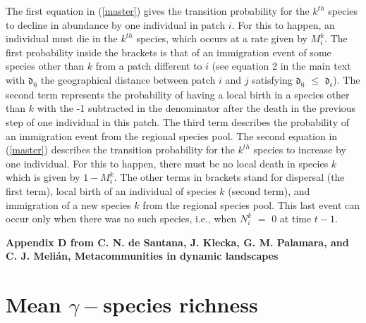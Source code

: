 \documentclass[12pt]{article}
\begin{document}
The first equation in (\ref{master}) gives the transition probability
for the $k^{th}$ species to decline in abundance by one individual in
patch $i$. For this to happen, an individual must die in the $k^{th}$
species, which occurs at a rate given by $M^{k}_{i}$. The first
probability inside the brackets is that of an immigration event of
some species other than $k$ from a patch different to $i$ (see
equation 2 in the main text with $\mathfrak{d_{ij}}$ the geographical
distance between patch $i$ and $j$ satisfying $\mathfrak{d_{ij}}$
$\leq$ $\mathfrak{d_{c}}$). The second term represents the probability
of having a local birth in a species other than $k$ with the -1
subtracted in the denominator after the death in the previous step of
one individual in this patch. The third term describes the probability
of an immigration event from the regional species pool. The second
equation in (\ref{master}) describes the transition probability for
the $k^{th}$ species to increase by one individual. For this to
happen, there must be no local death in species $k$ which is given by
$1 - M^{k}_{i}$. The other terms in brackets stand for dispersal (the
first term), local birth of an individual of species $k$ (second
term), and immigration of a new species $k$ from the regional species
pool. This last event can occur only when there was no such species,
i.e., when $N_{i}^{k}$ $=$ 0 at time $t - 1$.  

\clearpage
\begin{flushleft} 
{\Large \textbf{Appendix D from C. N. de Santana, J. Klecka, G. M. Palamara, and C. J. Meli\'{a}n, Metacommunities in dynamic landscapes}}
\section*{Mean $\gamma-$species richness}
\end{flushleft}
\renewcommand{\theequation}{D-\arabic{equation}}
\setcounter{equation}{0}
\renewcommand{\thesection}{D\arabic{section}}
\renewcommand{\thefigure}{D\arabic{figure}}
\renewcommand{\thetable}{D\arabic{table}}
\setcounter{figure}{0}
\setcounter{table}{0}
\end{document}
